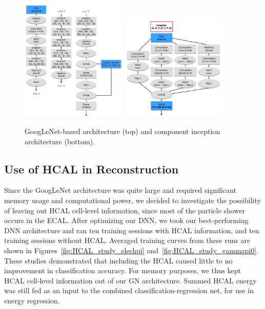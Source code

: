 \begin{figure}[htbp]
\centering
\includegraphics[width=0.45\textwidth]{Images/Calo/GN_architecture.png}
\includegraphics[width=0.45\textwidth]{Images/Calo/inception_architecture.png}
\caption{GoogLeNet-based architecture (top) and component inception architecture (bottom).
}
\label{fig:gn_with_inceptin}
\end{figure}

\subsection*{Use of HCAL in Reconstruction}

Since the GoogLeNet architecture was quite large and required significant memory usage and computational power, we decided to investigate the possibility of leaving out HCAL cell-level information, since most of the particle shower occurs in the ECAL. After optimizing our DNN, we took our best-performing DNN architecture and ran ten training sessions with HCAL information, and ten training sessions without HCAL. Averaged training curves from these runs are shown in Figures~\ref{fig:HCAL_study_elechpi} and~\ref{fig:HCAL_study_gammapi0}. These studies demonstrated that including the HCAL caused little to no improvement in classification accuracy. For memory purposes, we thus kept HCAL cell-level information out of our GN architecture. Summed HCAL energy was still fed as an input to the combined classification-regression net, for use in energy regression.

